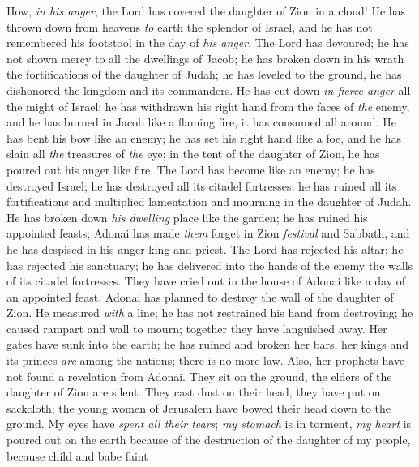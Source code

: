 \begin{biblechapter} %
 How, \textit{in his anger}, 
the Lord has covered the daughter of Zion in a cloud! 
He has thrown down from heavens \textit{to} earth 
the splendor of Israel, 
and he has not remembered his footstool 
in the day of \textit{his anger}.
\verse The Lord has devoured; he has not shown mercy 
to all the dwellings of Jacob; 
he has broken down in his wrath 
the fortifications of the daughter of Judah; 
he has leveled to the ground, he has dishonored 
the kingdom and its commanders.
\verse He has cut down \textit{in fierce anger} 
all the might of Israel; 
he has withdrawn his right hand 
from the faces of \textit{the} enemy, 
and he has burned in Jacob like a flaming fire, 
it has consumed all around.
\verse He has bent his bow like an enemy; 
he has set his right hand 
like a foe, and he has slain 
all \textit{the} treasures of \textit{the} eye; 
in the tent of the daughter of Zion, 
he has poured out his anger like fire.
\verse The Lord has become like an enemy; 
he has destroyed Israel; 
he has destroyed all its citadel fortresses; 
he has ruined all its fortifications 
and multiplied lamentation and mourning 
in the daughter of Judah.
\verse He has broken down \textit{his dwelling} place like the garden; 
he has ruined his appointed feasts; 
Adonai has made \textit{them} forget in Zion 
\textit{festival} and Sabbath, 
and he has despised in his anger 
king and priest.
\verse The Lord has rejected his altar; 
he has rejected his sanctuary; 
he has delivered into the hands of the enemy 
the walls of its citadel fortresses. 
They have cried out in the house of Adonai 
like a day of an appointed feast.
\verse Adonai has planned to destroy 
the wall of the daughter of Zion. 
He measured \textit{with} a line; he has not restrained 
his hand from destroying; 
he caused rampart and wall to mourn; 
together they have languished away.
\verse Her gates have sunk into the earth; 
he has ruined and broken her bars, 
her kings and its princes \textit{are} among the nations; 
there is no more law. 
Also, her prophets have not found 
a revelation from Adonai.
\verse They sit on the ground, 
the elders of the daughter of Zion are silent. 
They cast dust on their head, 
they have put on sackcloth; 
the young women of Jerusalem 
have bowed their head down to the ground.
\verse My eyes have \textit{spent all their tears}; 
\textit{my stomach} is in torment, 
\textit{my heart} is poured out on the earth 
because of the destruction of the daughter of my people, 
because child and babe faint 

\end{biblechapter}
